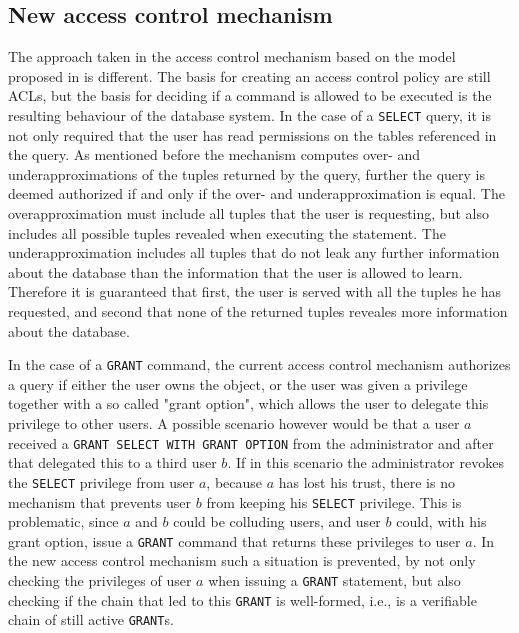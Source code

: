 \subsection{New access control mechanism}
%
The approach taken in the access control mechanism based on the model proposed in\cite{guarnieri2016strong} is different.
%
The basis for creating an access control policy are still ACLs, but the basis for deciding if a command is allowed to be executed is the resulting behaviour of the database system.
%
In the case of a \texttt{SELECT} query, it is not only required that the user has read permissions on the tables referenced in the query.
%
As mentioned before the mechanism computes over- and underapproximations of the tuples returned by the query, further the query is deemed authorized if and only if the over- and underapproximation is equal.
%
The overapproximation must include all tuples that the user is requesting, but also includes all possible tuples revealed when executing the statement.
%
The underapproximation includes all tuples that do not leak any further information about the database than the information that the user is allowed to learn.
%
Therefore it is guaranteed that first, the user is served with all the tuples he has requested, and second that none of the returned tuples reveales more information about the database.


In the case of a \texttt{GRANT} command, the current access control mechanism authorizes a query if either the user owns the object, or the user was given a privilege together with a so called "grant option", which allows the user to delegate this privilege to other users.
%
A possible scenario however would be that a user $a$ received a \texttt{GRANT SELECT WITH GRANT OPTION} from the administrator and after that delegated this to a third user $b$.
%
If in this scenario the administrator revokes the \texttt{SELECT} privilege from user $a$, because $a$ has lost his trust, there is no mechanism that prevents user $b$ from keeping his \texttt{SELECT} privilege.
%
This is problematic, since $a$ and $b$ could be colluding users, and user $b$ could, with his grant option, issue a \texttt{GRANT} command that returns these privileges to user $a$.
%
In the new access control mechanism such a situation is prevented, by not only checking the privileges of user $a$ when issuing a \texttt{GRANT} statement, but also checking if the chain that led to this \texttt{GRANT} is well-formed, i.e., is a verifiable chain of still active \texttt{GRANT}s.
